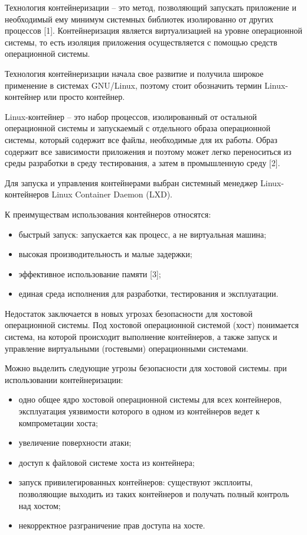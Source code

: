 Технология контейнеризации -- это метод, позволяющий запускать приложение и необходимый ему минимум системных библиотек изолированно от других процессов [1]. Контейнеризация является виртуализацией на уровне операционной системы, то есть изоляция приложения осуществляется с помощью средств операционной системы.\par
Технология контейнеризации начала свое развитие и получила широкое применение в системах GNU/Linux, поэтому стоит обозначить термин Linux-контейнер или просто контейнер.\par
Linux-контейнер -- это набор процессов, изолированный от остальной операционной системы и запускаемый с отдельного образа операционной системы, который содержит все файлы, необходимые для их работы. Образ содержит все зависимости приложения и поэтому может легко переноситься из среды разработки в среду тестирования, а затем в промышленную среду [2].\par
Для запуска и управления контейнерами выбран системный менеджер Linux-контейнеров Linux Container Daemon (LXD).\par
К преимуществам использования контейнеров относятся:
\begin{itemize}
\item быстрый запуск: запускается как процесс, а не виртуальная машина;
\item высокая производительность и малые задержки;
\item эффективное использование памяти [3];
\item единая среда исполнения для разработки, тестирования и эксплуатации.
\end{itemize}
\vspace{\baselineskip}

Недостаток заключается в новых угрозах безопасности для хостовой операционной системы. Под хостовой операционной системой (хост) понимается система, на которой происходит выполнение контейнеров, а также запуск и управление виртуальными (гостевыми) операционными системами.\par
  Можно выделить следующие угрозы безопасности для хостовой системы. при использовании контейнеризации:
\begin{itemize}
\item одно общее ядро хостовой операционной системы для всех контейнеров, эксплуатация уязвимости которого в одном из контейнеров ведет к компрометации хоста;
\item увеличение поверхности атаки;
\item доступ к файловой системе хоста из контейнера;
\item запуск привилегированных контейнеров: существуют эксплоиты, позволяющие выходить из таких контейнеров и получать полный контроль над хостом;
\item некорректное разграничение прав доступа на хосте.
\end{itemize}
\vspace{\baselineskip}

